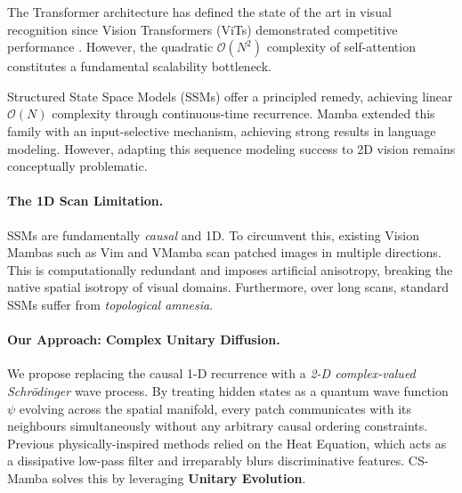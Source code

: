 \documentclass{article}
\newcommand{\cs}{CS-Mamba}
\begin{document}
The Transformer architecture \citep{vaswani2017attention} has defined the
state of the art in visual recognition since Vision Transformers (ViTs)
demonstrated competitive performance \citep{dosovitskiy2020vit, touvron2021deit}. 
However, the quadratic $\mathcal{O}(N^2)$ complexity of self-attention constitutes a 
fundamental scalability bottleneck.

Structured State Space Models (SSMs) \citep{gu2021s4} offer a principled remedy,
achieving linear $\mathcal{O}(N)$ complexity through continuous-time recurrence. 
Mamba \citep{gu2023mamba} extended this family with an input-selective mechanism, 
achieving strong results in language modeling. However, adapting this sequence modeling 
success to 2D vision remains conceptually problematic.

\paragraph{The 1D Scan Limitation.}
SSMs are fundamentally \emph{causal} and 1D. To circumvent this, existing Vision 
Mambas such as Vim \citep{zhu2024vim} and VMamba \citep{liu2024vmamba} scan patched 
images in multiple directions. This is computationally redundant and imposes artificial 
anisotropy, breaking the native spatial isotropy of visual domains. Furthermore, over 
long scans, standard SSMs suffer from \emph{topological amnesia}.

\paragraph{Our Approach: Complex Unitary Diffusion.}
We propose replacing the causal 1-D recurrence with a \emph{2-D complex-valued Schrödinger} wave
process. By treating hidden states as a quantum wave function $\psi$ evolving across the
spatial manifold, every patch communicates with its neighbours simultaneously
without any arbitrary causal ordering constraints. Previous physically-inspired methods 
relied on the Heat Equation, which acts as a dissipative low-pass filter and irreparably 
blurs discriminative features. \cs{} solves this by leveraging \textbf{Unitary Evolution}.
\end{document}
